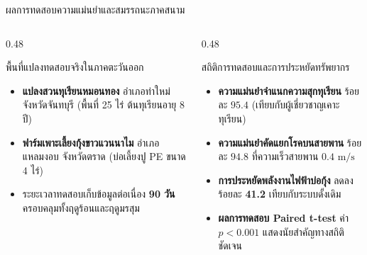 \documentclass[aspectratio=169, 10pt]{beamer}
\begin{document}
\begin{frame}{ผลการทดสอบความแม่นยำและสมรรถนะภาคสนาม}
\begin{columns}[T]
    \begin{column}{0.48\textwidth}
        \begin{mastercard}{พื้นที่แปลงทดสอบจริงในภาคตะวันออก}
            \begin{itemize}
                \item \textbf{แปลงสวนทุเรียนหมอนทอง} อำเภอท่าใหม่ จังหวัดจันทบุรี (พื้นที่ 25 ไร่ ต้นทุเรียนอายุ 8 ปี)
                \item \textbf{ฟาร์มเพาะเลี้ยงกุ้งขาวแวนนาไม} อำเภอแหลมงอบ จังหวัดตราด (บ่อเลี้ยงปู PE ขนาด 4 ไร่)
                \item ระยะเวลาทดสอบเก็บข้อมูลต่อเนื่อง \textbf{90 วัน} ครอบคลุมทั้งฤดูร้อนและฤดูมรสุม
            \end{itemize}
        \end{mastercard}
    \end{column}
    \begin{column}{0.48\textwidth}
        \begin{goldcard}{สถิติการทดสอบและการประหยัดทรัพยากร}
            \begin{itemize}
                \item \textbf{ความแม่นยำจำแนกความสุกทุเรียน} ร้อยละ $95.4$ (เทียบกับผู้เชี่ยวชาญเคาะทุเรียน)
                \item \textbf{ความแม่นยำคัดแยกโรคบนสายพาน} ร้อยละ $94.8$ ที่ความเร็วสายพาน $0.4\text{ m/s}$
                \item \textbf{การประหยัดพลังงานไฟฟ้าบ่อกุ้ง} ลดลงร้อยละ \textbf{41.2} เทียบกับระบบดั้งเดิม
                \item \textbf{ผลการทดสอบ Paired t-test} ค่า $p < 0.001$ แสดงนัยสำคัญทางสถิติชัดเจน
            \end{itemize}
        \end{goldcard}
    \end{column}
\end{columns}
\end{frame}
\end{document}
